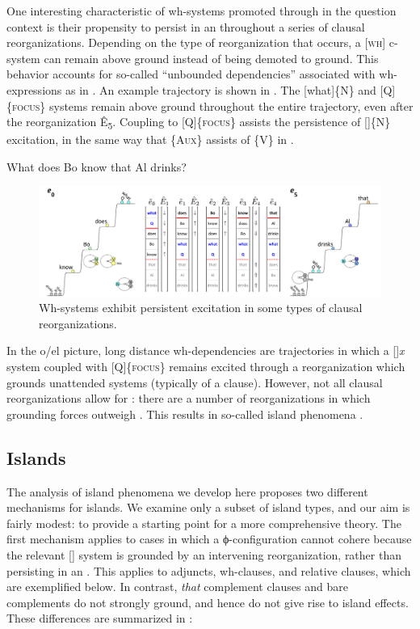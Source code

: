   One interesting characteristic of wh-systems promoted through  in the question context is their propensity to persist in an  throughout a series of clausal reorganizations. Depending on the type of reorganization that occurs, a [\textsc{wh}] c-system can remain above ground instead of being demoted to ground. This behavior accounts for so-called “unbounded dependencies” associated with wh-expressions as in . An example trajectory is shown in {}. The [what]\{N\} and [Q]\{\textsc{focus}\} systems remain above ground throughout the entire trajectory, even after the  reorganization Ê\textsubscript{5}. Coupling to [Q]\{\textsc{focus}\} assists the persistence of []\{N\} excitation, in the same way that \{A\textsc{ux}\} assists  of \{V\} in . 

  \ea\label{ex:7:20}
    {What does Bo know that Al drinks?}
\z
  
\begin{figure}
\includegraphics[width=\textwidth]{figures/Tilsen-img162.png}
\caption{Wh-systems exhibit persistent excitation in some types of clausal reorganizations.}
\label{fig:7:18}
\end{figure}
 

  In the o/el picture, long distance wh-dependencies are trajectories in which a []{\textit{x}} system coupled with [Q]\{\textsc{focus}\} remains excited through a reorganization which grounds unattended systems (typically of a clause). However, not all clausal reorganizations allow for : there are a number of reorganizations in which grounding forces outweigh . This results in so-called island phenomena \citep{Ross1967}.

\subsection{Islands}

The analysis of island phenomena we develop here proposes two different mechanisms for islands. We examine only a subset of island types, and our aim is fairly modest: to provide a starting point for a more comprehensive theory. The first mechanism applies to cases in which a ϕ-con\-fig\-u\-ra\-tion cannot cohere because the relevant [] system is grounded by an intervening reorganization, rather than persisting in an . This applies to adjuncts, wh-clauses, and relative clauses, which are exemplified below. In contrast, \textit{that} complement clauses and bare complements do not strongly ground, and hence do not give rise to island effects. These differences are summarized in {}:

